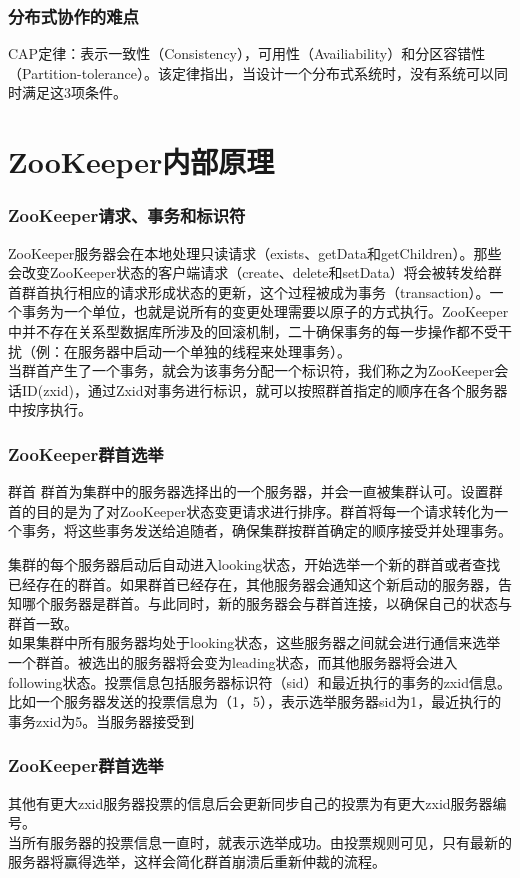 \documentclass{beamer}
\begin{document}
\begin{frame}
	\frametitle{分布式协作的难点}
	CAP定律：表示一致性（Consistency），可用性（Availiability）和分区容错性（Partition-tolerance）。该定律指出，当设计一个分布式系统时，没有系统可以同时满足这3项条件。
\end{frame}

\section{ZooKeeper内部原理}
\begin{frame}
	\frametitle{ZooKeeper请求、事务和标识符}
	ZooKeeper服务器会在本地处理只读请求（exists、getData和getChildren）。那些会改变ZooKeeper状态的客户端请求（create、delete和setData）将会被转发给群首群首执行相应的请求形成状态的更新，这个过程被成为事务（transaction）。一个事务为一个单位，也就是说所有的变更处理需要以原子的方式执行。ZooKeeper中并不存在关系型数据库所涉及的回滚机制，二十确保事务的每一步操作都不受干扰（例：在服务器中启动一个单独的线程来处理事务）。
	\\
	当群首产生了一个事务，就会为该事务分配一个标识符，我们称之为ZooKeeper会话ID(zxid)，通过Zxid对事务进行标识，就可以按照群首指定的顺序在各个服务器中按序执行。
\end{frame}

\begin{frame}
	\frametitle{ZooKeeper群首选举}
	\begin{block}{群首}
	群首为集群中的服务器选择出的一个服务器，并会一直被集群认可。设置群首的目的是为了对ZooKeeper状态变更请求进行排序。群首将每一个请求转化为一个事务，将这些事务发送给追随者，确保集群按群首确定的顺序接受并处理事务。
\end{block}

	集群的每个服务器启动后自动进入looking状态，开始选举一个新的群首或者查找已经存在的群首。如果群首已经存在，其他服务器会通知这个新启动的服务器，告知哪个服务器是群首。与此同时，新的服务器会与群首连接，以确保自己的状态与群首一致。
	\\
	如果集群中所有服务器均处于looking状态，这些服务器之间就会进行通信来选举一个群首。被选出的服务器将会变为leading状态，而其他服务器将会进入following状态。投票信息包括服务器标识符（sid）和最近执行的事务的zxid信息。比如一个服务器发送的投票信息为（1，5），表示选举服务器sid为1，最近执行的事务zxid为5。当服务器接受到
\end{frame}

\begin{frame}
	\frametitle{ZooKeeper群首选举}
	其他有更大zxid服务器投票的信息后会更新同步自己的投票为有更大zxid服务器编号。
	\\
	当所有服务器的投票信息一直时，就表示选举成功。由投票规则可见，只有最新的服务器将赢得选举，这样会简化群首崩溃后重新仲裁的流程。
\end{frame}
\end{document}
